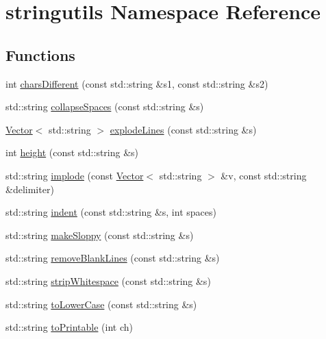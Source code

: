 \hypertarget{namespacestringutils}{}\section{stringutils Namespace Reference}
\label{namespacestringutils}
\subsection*{Functions}
\begin{DoxyCompactItemize}
\item 
int \mbox{\hyperlink{namespacestringutils_a3c38f7cde8e6340eb0ff2ae3820a2806}{chars\+Different}} (const std\+::string \&s1, const std\+::string \&s2)
\item 
std\+::string \mbox{\hyperlink{namespacestringutils_a38bb0a6bb1ecac04f607fb3cfb08cbca}{collapse\+Spaces}} (const std\+::string \&s)
\item 
\mbox{\hyperlink{classVector}{Vector}}$<$ std\+::string $>$ \mbox{\hyperlink{namespacestringutils_aadc9cdd19d79b42a72aa8694260b8675}{explode\+Lines}} (const std\+::string \&s)
\item 
int \mbox{\hyperlink{namespacestringutils_a777c9bd90569d1f9d2dc464a69ea45bd}{height}} (const std\+::string \&s)
\item 
std\+::string \mbox{\hyperlink{namespacestringutils_aa5ab45ed04eb980650e067e108733541}{implode}} (const \mbox{\hyperlink{classVector}{Vector}}$<$ std\+::string $>$ \&v, const std\+::string \&delimiter)
\item 
std\+::string \mbox{\hyperlink{namespacestringutils_afa26297e6041901fc89ea21f251c5bd3}{indent}} (const std\+::string \&s, int spaces)
\item 
std\+::string \mbox{\hyperlink{namespacestringutils_a3f3b01bff686e3495c275bcb492ec4d6}{make\+Sloppy}} (const std\+::string \&s)
\item 
std\+::string \mbox{\hyperlink{namespacestringutils_a65dad9d06071c45572573015f34e6841}{remove\+Blank\+Lines}} (const std\+::string \&s)
\item 
std\+::string \mbox{\hyperlink{namespacestringutils_a76709c55b9e0bcea3f17b9abc8962ae7}{strip\+Whitespace}} (const std\+::string \&s)
\item 
std\+::string \mbox{\hyperlink{namespacestringutils_a55769baf0b588c5d12813228a2e00389}{to\+Lower\+Case}} (const std\+::string \&s)
\item 
std\+::string \mbox{\hyperlink{namespacestringutils_a76282454fe7a94b5e58421de779e002f}{to\+Printable}} (int ch)

\end{DoxyCompactItemize}
